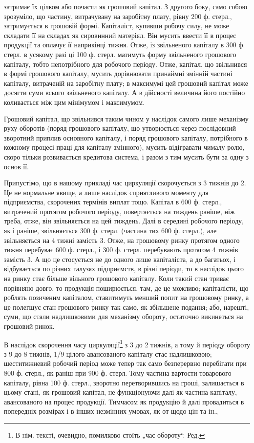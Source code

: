затримає їх цілком або почасти як грошовий капітал. З другого боку,
само собою зрозуміло, що частину, витрачувану на заробітну плату,
рівну 200 ф. стерл., затримується в грошовій формі. Капіталіст, купивши
робочу силу, не може складати її на складах як сировинний матеріял.
Він мусить ввести її в процес продукції та оплачує її наприкінці тижня.
Отже, із звільненого капіталу в 300 ф. стерл. в усякому разі ці 100 ф.
стерл. матимуть форму звільненого грошового капіталу, тобто непотрібного
для робочого періоду. Отже, капітал, що звільнився в формі грошового
капіталу, мусить дорівнювати принаймні змінній частині капіталу,
витраченій на заробітну плату; в максимумі цей грошовий капітал може
досягти суми всього звільненого капіталу. А в дійсності величина його
постійно коливається між цим мінімумом і максимумом.

Грошовий капітал, що звільнився таким чином у наслідок самого
лише механізму руху оборотів (поряд грошового капіталу, що утворюється
через послідовний зворотний приплив основного капіталу, і поряд грошового
капіталу, потрібного в кожному процесі праці для капіталу змінного),
мусить відігравати чималу ролю, скоро тільки розвивається кредитова
система, і разом з тим мусить бути за одну з основ її.

Припустімо, що в нашому прикладі час циркуляції скорочується
з 3 тижнів до 2. Це не нормальне явище, а лише наслідок сприятливого
моменту для підприємства, скорочених термінів виплат тощо. Капітал
в 600 ф. стерл., витрачений протягом робочого періоду, повертається на
тиждень раніше, ніж треба, отже, він звільняється на цей тиждень. Далі
в середині робочого періоду, як і раніше, звільняється 300 ф. стерл.
(частина тих 600 ф. стерл.), але звільняється на 4 тижні замість 3.
Отже, на грошовому ринку протягом одного тижня перебуває 600 ф.
стерл., і 300 ф. стерл. перебувають протягом 4 тижнів замість 3. А що це
стосується не до одного лише капіталіста, а до багатьох, і відбувається по
різних галузях підприємств, в різні періоди, то в наслідок цього на ринку
стає більше вільного грошового капіталу. Коли такий стан триває порівняно
довго, то продукція поширюється, там, де це можливо; капіталісти,
що роблять позиченим капіталом, ставитимуть менший попит на грошовому
ринку, а це полегшує стан грошового ринку так само, як збільшене
подання; або, нарешті, суми, що стали надлишковими для механізму
обороту, остаточно викинеться на грошовий ринок.

В наслідок скорочення часу циркуляції\footnote*{
В нім. тексті, очевидно, помилково стоїть „час обороту“. Ред.
} з 3 до 2 тижнів, а тому й
періоду обороту з 9 до 8 тижнів, 1/9 цілого авансованого капіталу
стає надлишковою; шеститижневий робочий період може тепер так само
безперервно перебігати при 800 ф. стерл., як раніш при 900 ф. стерл.
Тому частина вартости товарового капіталу, рівна 100 ф. стерл., зворотно
перетворившись на гроші, залишається в цьому стані, як грошовий
капітал, не функціонуючи далі як частина капіталу, авансованого на
процес продукції. Тимчасом як продукцію й далі провадиться в попередніх
розмірах і в інших незмінних умовах, як от щодо цін та ін.,